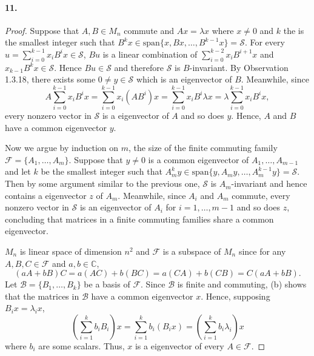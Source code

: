   \paragraph{11.}
  \begin{proof}
    Suppose that $A,B\in M_n$ commute and $Ax=\lambda x$ where $x\ne 0$ and $k$
    the is the smallest integer such that $B^kx \in \text{span}\{x,Bx,\dots,
    B^{k-1}x\} = \mathcal{S}$. For every $u=\sum_{i=0}^{k-1} x_iB^ix \in
    \mathcal{S}$, $Bu$ is a linear combination of $\sum_{i=0}^{k-2} x_iB^{i+1}x$
    and $x_{k-1}B^kx \in\mathcal{S}$. Hence $Bu\in\mathcal{S}$ and therefore 
    $\mathcal{S}$ is $B$-invariant. By Observation 1.3.18, there exists some 
    $0\ne y\in\mathcal{S}$ which is an eigenvector of $B$. Meanwhile, since
    \[
      A\sum_{i=0}^{k-1} x_iB^i x = \sum_{i=0}^{k-1} x_i(AB^i)x =
      \sum_{i=0}^{k-1} x_i B^i\lambda x = \lambda\sum_{i=0}^{k-1} x_iB^i x,
    \]
    every nonzero vector in $\mathcal{S}$ is a eigenvector of $A$ and so does 
    $y$. Hence, $A$ and $B$ have a common eigenvector $y$.\par
    Now we argue by induction on $m$, the size of the finite commuting family 
    $\mathcal{F}=\{A_1,\dots,A_m\}$. Suppose that $y\ne 0$ is a common 
    eigenvector of $A_1,\dots,A_{m-1}$ and let $k$ be the smallest integer such
    that $A^k_my\in \text{span}\{y,A_my,\dots, A_m^{k-1}y\}=\mathcal{S}$. Then 
    by some argument similar to the previous one, $\mathcal{S}$ is 
    $A_m$-invariant and hence contains a eigenvector $z$ of $A_m$. Meanwhile, 
    since $A_i$ and $A_m$ commute, every nonzero vector in $\mathcal{S}$ is an
    eigenvector of $A_i$ for $i=1,\dots,m-1$ and so does $z$, concluding that 
    matrices in a finite commuting families share a common eigenvector.\par
    $M_n$ is linear space of dimension $n^2$ and $\mathcal{F}$ is a subspace of 
    $M_n$ since for any $A,B,C\in\mathcal{F}$ and $a,b\in\mathbb{C}$,
    \[
      (aA+bB)C = a(AC) + b(BC) = a(CA) + b(CB) = C(aA+bB).
    \]
    Let $\mathcal{B}=\{B_1,\dots,B_k\}$ be a basis of $\mathcal{F}$. Since 
    $\mathcal{B}$ is finite and commuting, (b) shows that the matrices in 
    $\mathcal{B}$ have a common eigenvector $x$. Hence, supposing $B_ix=
    \lambda_i x$,
    \[
      \left(\sum_{i=1}^k b_iB_i\right)x = \sum_{i=1}^k b_i(B_ix) = 
      \left(\sum_{i=1}^k b_i\lambda_i\right)x
    \]
    where $b_i$ are some scalars. Thus, $x$ is a eigenvector of every $A\in
    \mathcal{F}$.
  \end{proof}


